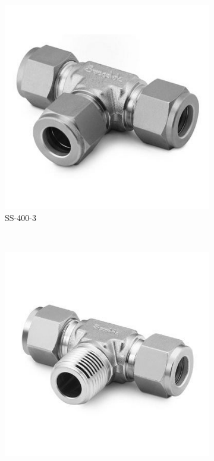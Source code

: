 \documentclass[a4paper,12pt,oneside]{article}
\begin{document}
\begin{appendices}
\begin{figure}[H]
    \centering
    \begin{subfigure}[b]{0.21\textwidth}
    \centering
    \includegraphics[width=\textwidth]{appendix/img/interfaces/SS-400-3.jpg}
    \caption{SS-400-3}
    \end{subfigure}
    ~
    \begin{subfigure}[b]{0.21\textwidth}
    \centering
    \includegraphics[width=\textwidth]{appendix/img/interfaces/SS-400-3-4TTM.jpg}

\end{subfigure}
\end{figure}
\end{appendices}
\end{document}
